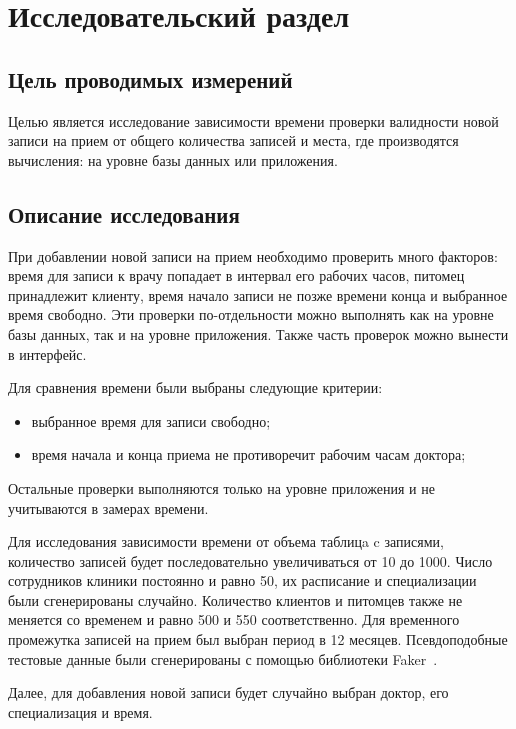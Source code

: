 \section{Исследовательский раздел}

\subsection{Цель проводимых измерений}

Целью является исследование зависимости времени проверки валидности новой записи на прием от общего количества записей и места, где производятся вычисления: на уровне базы данных или приложения.

\subsection{Описание исследования}

При добавлении новой записи на прием необходимо проверить много факторов: время для записи к врачу попадает в интервал его рабочих часов, питомец принадлежит клиенту, время начало записи не позже времени конца и выбранное время свободно. Эти проверки по-отдельности можно выполнять как на уровне базы данных, так и на уровне приложения. Также часть проверок можно вынести в интерфейс.

Для сравнения времени были выбраны следующие критерии:
\begin{itemize}[label*=---]
	\item выбранное время для записи свободно;
	\item время начала и конца приема не противоречит рабочим часам доктора;
\end{itemize}

Остальные проверки выполняются только на уровне приложения и не учитываются в замерах времени.  

Для исследования зависимости времени от объема таблицa c записями, количество записей будет последовательно увеличиваться от 10 до 1000. Число сотрудников клиники постоянно и равно 50, их расписание и специализации были сгенерированы случайно. Количество клиентов и питомцев также не меняется со временем и равно 500 и 550 соответственно. Для временного промежутка записей на прием был выбран период в 12 месяцев. Псевдоподобные тестовые данные были сгенерированы с помощью библиотеки Faker~\cite{faker}.

Далее, для добавления новой записи будет случайно выбран доктор, его специализация и время.  

